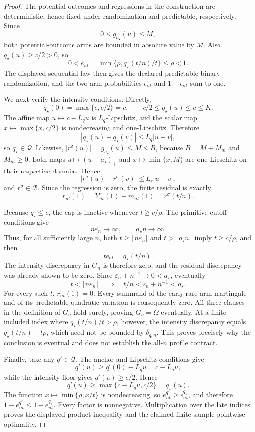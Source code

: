 \documentclass{article}
\begin{document}
\begin{proof}
The potential outcomes and regressions in the construction are deterministic, hence fixed under randomization and predictable, respectively. Since
\[
 0\le g_{a_\star}(u)\le M,
\]
both potential-outcome arms are bounded in absolute value by \(M\). Also \(q_\star(u)\ge c/2>0\), so
\[
 0<e_{nt}=\min\{\rho,q_\star(t/n)/t\}\le\rho<1.
\]
The displayed sequential law then gives the declared predictable binary randomization, and the two arm probabilities \(e_{nt}\) and \(1-e_{nt}\) sum to one.

We next verify the intensity conditions. Directly,
\[
 q_\star(0)=\max\{c,c/2\}=c,
 \qquad c/2\le q_\star(u)\le c\le K.
\]
The affine map \(u\mapsto c-L_qu\) is \(L_q\)-Lipschitz, and the scalar map \(x\mapsto\max\{x,c/2\}\) is nondecreasing and one-Lipschitz. Therefore
\[
 |q_\star(u)-q_\star(v)|\le L_q|u-v|,
\]
so \(q_\star\in\mathcal Q\). Likewise, \(|r^\sigma(u)|=g_{a_\star}(u)\le M\le B\), because \(B=M+M_m\) and \(M_m\ge0\). Both maps \(u\mapsto(u-a_\star)_+\) and \(x\mapsto\min\{x,M\}\) are one-Lipschitz on their respective domains. Hence
\[
 |r^\sigma(u)-r^\sigma(v)|\le L_r|u-v|,
\]
and \(r^\sigma\in\mathcal R\). Since the regression is zero, the finite residual is exactly
\[
 r_{nt}(1)=Y_{nt}^\sigma(1)-m_{nt}(1)=r^\sigma(t/n).
\]

Because \(q_\star\le c\), the cap is inactive whenever \(t\ge c/\rho\). The primitive cutoff conditions give
\[
 n\varepsilon_n\longrightarrow\infty,
 \qquad a_\star n\longrightarrow\infty.
\]
Thus, for all sufficiently large \(n\), both \(t\ge\lceil n\varepsilon_n\rceil\) and \(t>\lfloor a_\star n\rfloor\) imply \(t\ge c/\rho\), and then
\[
 t e_{nt}=q_\star(t/n).
\]
The intensity discrepancy in \(G_n\) is therefore zero, and the residual discrepancy was already shown to be zero. Since \(\varepsilon_n+n^{-1}\to0<a_\star\), eventually
\[
 t<\lceil n\varepsilon_n\rceil
 \quad\Longrightarrow\quad
 t/n<\varepsilon_n+n^{-1}<a_\star.
\]
For every such \(t\), \(r_{nt}(1)=0\). Every summand of the early rare-arm martingale and of its predictable quadratic variation is consequently zero. All three clauses in the definition of \(G_n\) hold surely, proving \(G_n=\Omega\) eventually. At a finite included index where \(q_\star(t/n)/t>\rho\), however, the intensity discrepancy equals \(q_\star(t/n)-t\rho\), which need not be bounded by \(\delta_{q,n}\). This proves precisely why the conclusion is eventual and does not establish the all-\(n\) profile contract.

Finally, take any \(q'\in\mathcal Q\). The anchor and Lipschitz conditions give
\[
 q'(u)\ge q'(0)-L_qu=c-L_qu,
\]
while the intensity floor gives \(q'(u)\ge c/2\). Hence
\[
 q'(u)\ge\max\{c-L_qu,c/2\}=q_\star(u).
\]
The function \(x\mapsto\min\{\rho,x/t\}\) is nondecreasing, so \(e_{nt}^{q'}\ge e_{nt}^{q_\star}\), and therefore \(1-e_{nt}^{q'}\le1-e_{nt}^{q_\star}\). Every factor is nonnegative. Multiplication over the late indices proves the displayed product inequality and the claimed finite-sample pointwise optimality.
\end{proof}
\end{document}
